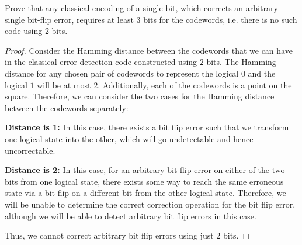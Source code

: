 \begin{solution}[label=ques:6a]
  \begin{question}
    Prove that any classical encoding of a single bit, which corrects
an arbitrary single bit-flip error, requires at least 3 bits for the
codewords,  i.e. there is no such code using 2 bits.
  \end{question}
  \tcblower{}
  \begin{proof}[Proof]
    Consider the Hamming distance between the codewords that we can have in the classical error detection code constructed using $2$ bits. The Hamming distance for any chosen pair of codewords to represent the logical $0$ and the logical $1$ will be at most $2$. Additionally, each of the codewords is a point on the square. Therefore, we can consider the two cases for the Hamming distance between the codewords separately:\par

    \begin{minipage}{\texwidth}
    \end{minipage}

    \textbf{Distance is 1:} In this case, there exists a bit flip error such that we transform one logical state into the other, which will go undetectable and hence uncorrectable.\par
    \textbf{Distance is 2:} In this case, for an arbitrary bit flip error on either of the two bits from one logical state, there exists some way to reach the same erroneous state via a bit flip on a different bit from the other logical state. Therefore, we will be unable to determine the correct correction operation for the bit flip error, although we will be able to detect arbitrary bit flip errors in this case.\par
    Thus, we cannot correct arbitrary bit flip errors using just $2$ bits.
  \end{proof}
\end{solution}

